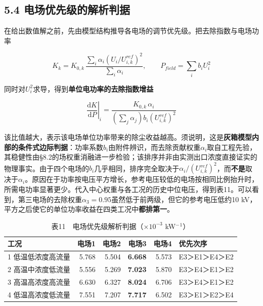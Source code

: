 \documentclass[UTF8,zihao=5,a4paper]{ctexart}
\begin{document}
\subsection*{5.4 电场优先级的解析判据}

在给出数值解之前，先由模型结构推导各电场的调节优先级。把去除指数与电场功率

\begin{equation}
K_k=K_{0,k}\,\frac{\sum_i\alpha_i\left(U_i/U_{i,k}^{ref}\right)^{2}}{\sum_i\alpha_i},
\qquad P_{field}=\sum_i b_iU_i^{2}
\end{equation}

同时对$U_i^{2}$求导，得到\textbf{单位电功率的去除指数增益}

\begin{equation}
\left.\frac{\mathrm{d}K}{\mathrm{d}P}\right|_i=\frac{K_{0,k}\,\alpha_i}{\left(\sum_j\alpha_j\right) b_i \left(U_{i,k}^{ref}\right)^{2}} 
\end{equation}

该比值越大，表示该电场单位功率带来的除尘收益越高。须说明，这是\textbf{灰箱模型内部的条件式边际判据}：功率系数$b_i$由附件辨识，而去除贡献权重$\alpha_i$取自工程先验，其稳健性由§8.2的场权重消融进一步检验；该排序并非由实测出口浓度直接证实的物理事实。由于四个电场的$b_i$几乎相同，排序完全取决于$\alpha_i/(U^{ref}_{i,k})^{2}$，而\textbf{不是}取决于$\alpha_i$。原因在于功率按电压平方增长，参考电压较低的电场按相同比例抬升时，所需电功率显著更少。代入中心权重与各工况的历史中位电压，得到表11。可以看到，第三电场的去除权重$\alpha_3=0.95$虽然低于前两级，但它的参考电压低约10 kV，平方之后使它的单位功率收益在四类工况中\textbf{都排第一}。


\begin{table}[htbp]
\centering
\caption*{\normalsize 表11　电场优先级解析判据（$\times10^{-3}$ kW$^-$$^1$）}
\vspace{-2pt}
\begin{tabular}{lrrrrl}
\toprule
工况 & 电场1 & 电场2 & 电场3 & 电场4 & 优先次序 \\
\midrule
1 低温低浓度高流量 & 5.768 & 5.504 & \textbf{6.668} & 5.573 & E3＞E1＞E4＞E2 \\
2 高温中浓度低流量 & 5.556 & 5.269 & \textbf{7.023} & 5.870 & E3＞E4＞E1＞E2 \\
3 高温高浓度高流量 & 6.630 & 6.327 & \textbf{8.024} & 6.706 & E3＞E4＞E1＞E2 \\
4 低温高浓度低流量 & 7.551 & 7.207 & \textbf{7.717} & 6.502 & E3＞E1＞E2＞E4 \\
\bottomrule
\end{tabular}
\end{table}
\end{document}
